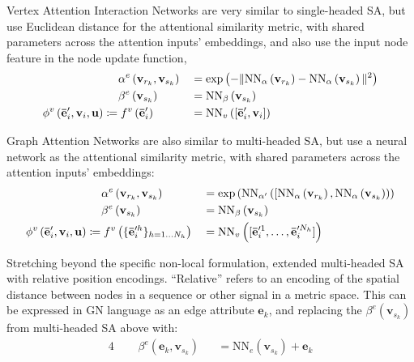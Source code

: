 Vertex Attention Interaction Networks \citep{hoshen2017vain} are very similar to single-headed SA, but use Euclidean distance for the attentional similarity metric, with shared parameters across the attention inputs' embeddings, and also use the input node feature in the node update function,
\begin{alignat*}{4}
&\phantom{{}={}} \alpha^e\left(\mathbf{v}_{r_k}, \mathbf{v}_{s_k}\right) &&= \exp\left(-\Vert\mathrm{NN}_{\alpha}\left(\mathbf{v}_{r_k}\right) - \mathrm{NN}_{\alpha}\left(\mathbf{v}_{s_k}\right)\Vert^2\right) \\
&\phantom{{}={}} \beta^e\left(\mathbf{v}_{s_k}\right) &&=  \mathrm{NN}_{\beta}\left(\mathbf{v}_{s_k}\right) \\
\phi^v\left(\mathbf{\bar{e}}'_i, \mathbf{v}_i, \globals\right) &\coloneqq f^v\left(\mathbf{\bar{e}}'_i\right) &&= \mathrm{NN}_v \left([\mathbf{\bar{e}}'_i, \mathbf{v}_i]\right)
\end{alignat*}

Graph Attention Networks \citep{velivckovic2017graph} are also similar to multi-headed SA, but use a neural network as the attentional similarity metric, with shared parameters across the attention inputs' embeddings:
\begin{alignat*}{4}
&\phantom{{}={}} \alpha^e\left(\mathbf{v}_{r_k}, \mathbf{v}_{s_k}\right) &&= \exp\left(\mathrm{NN}_{\alpha'}\left([\mathrm{NN}_\alpha\left(\mathbf{v}_{r_k}\right), \mathrm{NN}_\alpha\left(\mathbf{v}_{s_k}\right)\right)\right) \\
&\phantom{{}={}} \beta^e\left(\mathbf{v}_{s_k}\right) &&=  \mathrm{NN}_\beta\left(\mathbf{v}_{s_k}\right) \\
\phi^v\left(\mathbf{\bar{e}}'_i, \mathbf{v}_i, \globals\right) &\coloneqq f^v\left(\{\mathbf{\bar{e}}'^h_i\}_{h = 1 \dots N_h}\right) &&= \mathrm{NN}_v\left([\mathbf{\bar{e}}'^1_i, \dots, \mathbf{\bar{e}}'^{N_h}_i]\right)
\end{alignat*}

Stretching beyond the specific non-local formulation, \cite{shaw2018self} extended multi-headed SA with relative position encodings. ``Relative'' refers to an encoding of the spatial distance between nodes in a sequence or other signal in a metric space. This can be expressed in GN language as an edge attribute $\mathbf{e}_k$, and replacing the $\beta^e\left(\mathbf{v}_{s_k}\right)$ from multi-headed SA above with:
\begin{alignat*}{4}
&\phantom{{}={}} \beta^e\left(\mathbf{e}_k, \mathbf{v}_{s_k}\right) &&= \mathrm{NN}_e\left(\mathbf{v}_{s_k}\right) + \mathbf{e}_k
\end{alignat*}


